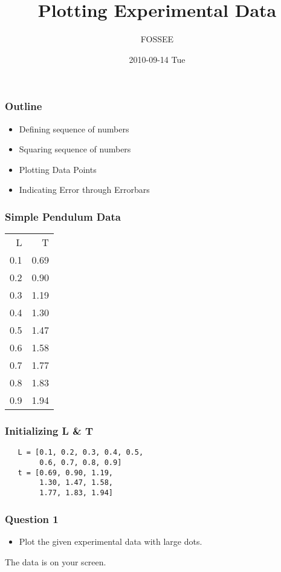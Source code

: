 \documentclass[presentation]{beamer}
\title{Plotting Experimental Data}
\author{FOSSEE}
\date{2010-09-14 Tue}
\begin{document}
\maketitle









\begin{frame}
\frametitle{Outline}
\label{sec-1}

\begin{itemize}
\item Defining sequence of numbers
\item Squaring sequence of numbers
\item Plotting Data Points
\item Indicating Error through Errorbars
\end{itemize}
\end{frame}
\begin{frame}
\frametitle{Simple Pendulum Data}
\label{sec-2}




\begin{center}
\begin{tabular}{rr}
   L  &     T  \\
 0.1  &  0.69  \\
 0.2  &  0.90  \\
 0.3  &  1.19  \\
 0.4  &  1.30  \\
 0.5  &  1.47  \\
 0.6  &  1.58  \\
 0.7  &  1.77  \\
 0.8  &  1.83  \\
 0.9  &  1.94  \\
\end{tabular}
\end{center}


  
\end{frame}
\begin{frame}[fragile]
\frametitle{Initializing L \& T}
\label{sec-3}

\begin{verbatim}
   L = [0.1, 0.2, 0.3, 0.4, 0.5,
        0.6, 0.7, 0.8, 0.9]
   t = [0.69, 0.90, 1.19,
        1.30, 1.47, 1.58,
        1.77, 1.83, 1.94]
\end{verbatim}
\end{frame}
\begin{frame}
\frametitle{Question 1}
\label{sec-4}

\begin{itemize}
\item Plot the given experimental data with large dots.
\end{itemize}

  The data is on your screen.     
  
\end{frame}
\end{document}
